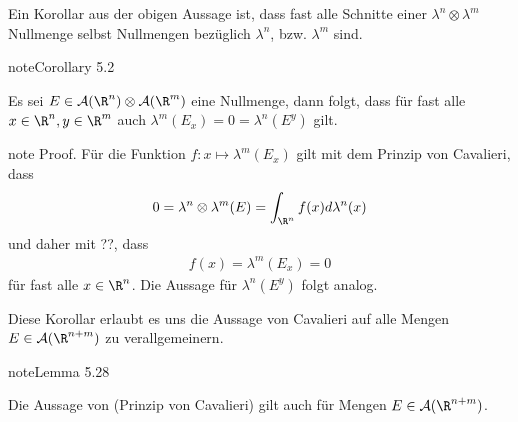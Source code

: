 \documentclass[letterpaper,10pt,german]{jupyterBook}
\begin{document}
\sphinxAtStartPar
Ein Korollar aus der obigen Aussage ist, dass fast alle Schnitte einer \(\lambda^n\otimes\lambda^m\) Nullmenge selbst Nullmengen bezüglich \(\lambda^n\), bzw. \(\lambda^m\) sind.
\label{masstheorie/integrationstechnik:cor:zeroprodset}
\begin{sphinxadmonition}{note}{Corollary 5.2}



\sphinxAtStartPar
Es sei \(E\in\mathcal{A}(\R^n)\otimes\mathcal{A}(\R^m)\) eine Nullmenge, dann folgt, dass für fast alle \(x\in\R^n,y\in\R^m\) auch \(\lambda^m(E_x)=0=\lambda^n(E^y)\) gilt.
\end{sphinxadmonition}

\begin{sphinxadmonition}{note}
\sphinxAtStartPar
Proof. Für die Funktion \(f:x\mapsto \lambda^m(E_x)\) gilt mit dem Prinzip von Cavalieri, dass
\begin{equation*}
\begin{split}0 = \lambda^{n}\otimes\lambda^{m}(E) = \int_{\R^n} f(x)d\lambda^n(x)\end{split}
\end{equation*}
\sphinxAtStartPar
und daher mit ??, dass
\begin{equation*}
\begin{split}f(x)=\lambda^m(E_x)=0\end{split}
\end{equation*}
\sphinxAtStartPar
für fast alle \(x\in\R^n\). Die Aussage für \(\lambda^n(E^y)\) folgt analog.
\end{sphinxadmonition}

\sphinxAtStartPar
Diese Korollar erlaubt es uns die Aussage von Cavalieri auf alle Mengen \(E\in \mathcal{A}(\R^{n+m})\) zu verallgemeinern.
\label{masstheorie/integrationstechnik:lemma-19}
\begin{sphinxadmonition}{note}{Lemma 5.28}



\sphinxAtStartPar
Die Aussage von {\hyperref[\detokenize{masstheorie/integrationstechnik:thm:cavalieri}]{}} (Prinzip von Cavalieri) gilt auch für Mengen \(E\in \mathcal{A}(\R^{n+m})\).
\end{sphinxadmonition}
\end{document}
